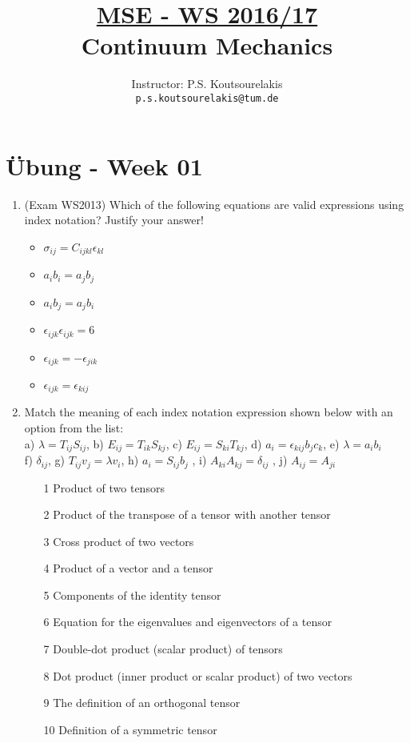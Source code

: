 \documentclass{article}
\title{\underline{MSE - WS 2016/17}\\
Continuum Mechanics}
\author{
Instructor: P.S. Koutsourelakis  \\
\texttt{p.s.koutsourelakis@tum.de} \\
}
\newcommand{\bi}{\begin{itemize}}
\newcommand{\ei}{\end{itemize}}
\begin{document}
\makeanontitle

%

\section*{\"Ubung - Week 01}


\begin{enumerate}
\item (Exam WS2013) Which of the following equations are valid expressions using index notation? Justify your answer!
\bi
\item $\sigma_{ij}=C_{ijkl} \epsilon_{kl}$
\item $a_i b_i = a_j b_j$
\item $a_i b_j = a_j b_i$
\item $\epsilon_{ijk}\epsilon_{ijk}=6$
\item $\epsilon_{ijk} = -\epsilon_{jik}$
\item $\epsilon_{ijk} = \epsilon_{kij}$
\ei

\item Match the meaning of each index notation expression shown below with an option from the list: \\
a) $\lambda =T_{ij}S_{ij}$, \quad b)  $E_{ij}=T_{ik}S_{kj}$, \quad c) $E_{ij}=S_{ki}T_{kj}$, \quad d) 
$a_i=\epsilon_{kij}b_j c_k$, \quad e)  $\lambda=a_ib_i$ \\ f) $\delta_{ij}$, \quad g) $T_{ij}v_j=\lambda v_i$, \quad h)
$a_i=S_{ij}b_j$ , \quad i) $A_{ki}A_{kj}=\delta_{ij}$ , \quad j) $A_{ij}=A_{ji}$ \\
\bi
\item[1] Product of two tensors
\item[2] Product of the transpose of a tensor with another tensor
\item[3] Cross product of two vectors
\item[4] Product of a vector and a tensor
\item[5] Components of the identity tensor
\item[6] Equation for the eigenvalues and eigenvectors of a tensor
\item[7] Double-dot product (scalar product) of tensors
\item[8] Dot product (inner product or scalar product) of two vectors
\item[9] The definition of an orthogonal tensor
\item[10] Definition of a symmetric tensor
\ei


\end{enumerate}
\end{document}
